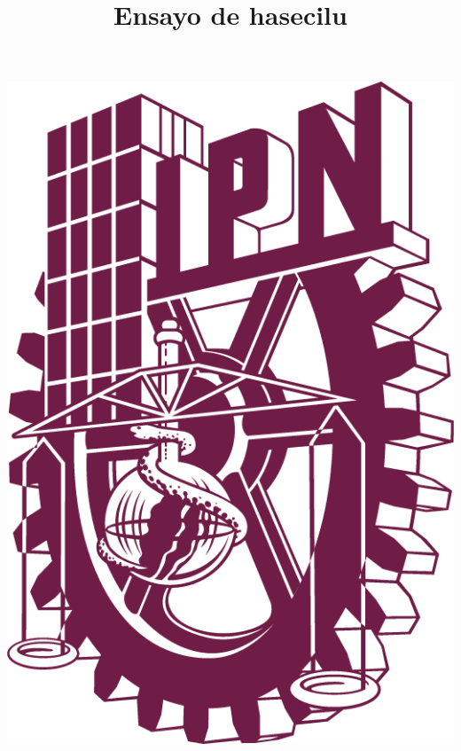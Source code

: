 	
\title{Ensayo de hasecilu}

\thispagestyle{empty} %

\begin{center}
\newcommand{\HRule}{\rule{\linewidth}{1mm}}

\begin{minipage}{0.48\textwidth}
	\begin{flushleft}
		\includegraphics[scale = 0.125]{images/LOGO POLI PANTONE 222 C.png}
	\end{flushleft}
\end{minipage}

\end{center}
